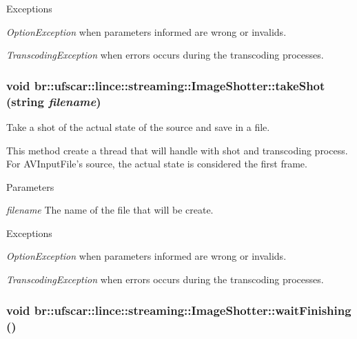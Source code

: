 \begin{DoxyExceptions}{Exceptions}
\item[{\em OptionException}]when parameters informed are wrong or invalids. \item[{\em TranscodingException}]when errors occurs during the transcoding processes. \end{DoxyExceptions}
\hypertarget{classbr_1_1ufscar_1_1lince_1_1streaming_1_1ImageShotter_a7a1938df6d0b9b4f5930347b821dd17f}{
\subsubsection[{takeShot}]{\setlength{\rightskip}{0pt plus 5cm}void br::ufscar::lince::streaming::ImageShotter::takeShot (string {\em filename})}}
\label{classbr_1_1ufscar_1_1lince_1_1streaming_1_1ImageShotter_a7a1938df6d0b9b4f5930347b821dd17f}


Take a shot of the actual state of the source and save in a file. 

This method create a thread that will handle with shot and transcoding process. For AVInputFile's source, the actual state is considered the first frame. 
\begin{DoxyParams}{Parameters}
\item[{\em filename}]The name of the file that will be create. \end{DoxyParams}

\begin{DoxyExceptions}{Exceptions}
\item[{\em OptionException}]when parameters informed are wrong or invalids. \item[{\em TranscodingException}]when errors occurs during the transcoding processes. \end{DoxyExceptions}
\hypertarget{classbr_1_1ufscar_1_1lince_1_1streaming_1_1ImageShotter_ac65dc640a0e5d28661029fb387f18a1a}{
\subsubsection[{waitFinishing}]{\setlength{\rightskip}{0pt plus 5cm}void br::ufscar::lince::streaming::ImageShotter::waitFinishing ()}}
\label{classbr_1_1ufscar_1_1lince_1_1streaming_1_1ImageShotter_ac65dc640a0e5d28661029fb387f18a1a}


